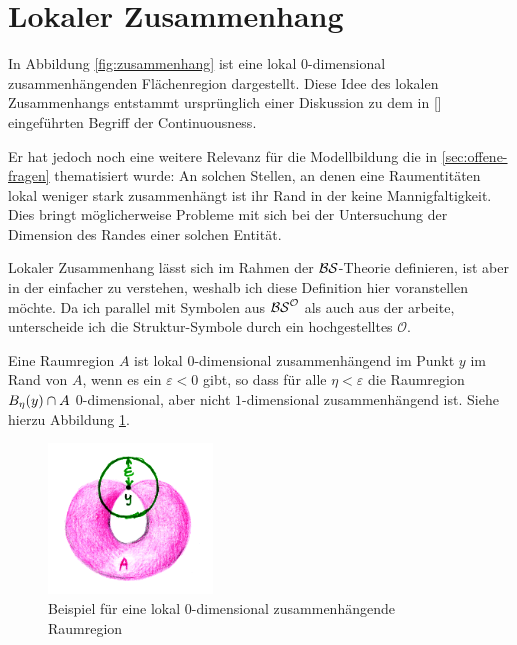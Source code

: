 \section{Lokaler Zusammenhang}\label{sec:lok-zusammenhang}

    In Abbildung \ref{fig:zusammenhang} ist 
    eine lokal $0$-dimensional zusammenhängenden Flächenregion dargestellt.
    Diese Idee des lokalen Zusammenhangs entstammt ursprünglich einer Diskussion zu dem in [\cite{baumann-r-2019--a}] eingeführten Begriff der Continuousness.

    Er hat jedoch noch eine weitere Relevanz für die Modellbildung die in \ref{sec:offene-fragen} thematisiert wurde:
    An solchen Stellen, an denen eine Raumentitäten lokal weniger stark zusammenhängt ist ihr Rand in der \strukt keine Mannigfaltigkeit.
    Dies bringt möglicherweise Probleme mit sich bei der Untersuchung der Dimension des Randes einer solchen Entität.

    Lokaler Zusammenhang lässt sich im Rahmen der $\mathcal{BS}$-Theorie definieren, ist aber in der \strukt einfacher zu verstehen, weshalb ich diese Definition hier voranstellen möchte.
    Da ich parallel mit Symbolen aus $\mathcal{BS}^{\mathcal{O}}$ als auch aus der \strukt arbeite, unterscheide ich die Struktur-Symbole durch ein hochgestelltes $\mathcal{O}$.

    Eine Raumregion $A$ ist lokal $0$-dimensional zusammenhängend im Punkt $y$ im Rand von $A$, wenn es ein $\varepsilon < 0$ gibt, so dass für alle $\eta < \varepsilon$ die Raumregion $B_{\eta}(y) \cap A$ $0$-dimensional, aber nicht $1$-dimensional zusammenhängend ist. Siehe hierzu Abbildung \ref{fig:loc0dc}.
    
    \begin{figure}[ht]
        \centering
        \includegraphics[height=4cm]{bearbeitet-22-04-25/loc0dc.png}
        \caption{Beispiel für eine lokal $0$-dimensional zusammenhängende Raumregion}
        \label{fig:loc0dc}
    \end{figure}
    
